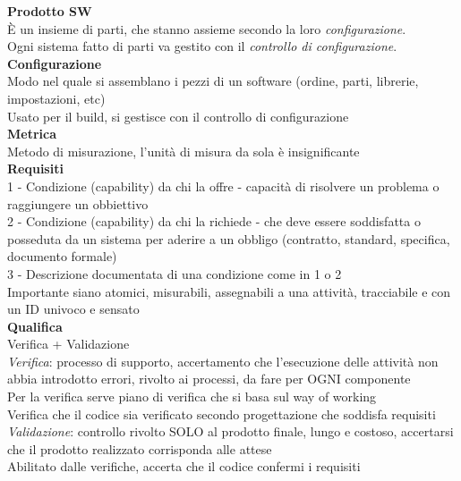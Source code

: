 \documentclass{article}
\begin{document}
		\textbf{Prodotto SW}\\
		È un insieme di parti, che stanno assieme secondo la loro \textit{configurazione}.\\
		Ogni sistema fatto di parti va gestito con il \textit{controllo di configurazione}.\\
			
		\textbf{Configurazione}\\
		Modo nel quale si assemblano i pezzi di un software (ordine, parti, librerie, impostazioni, etc)\\
		Usato per il build, si gestisce con il controllo di configurazione\\
			
		\textbf{Metrica}\\
		Metodo di misurazione, l'unità di misura da sola è insignificante\\
		
		\textbf{Requisiti}\\
		1 - Condizione (capability) da chi la offre - capacità di risolvere un problema o raggiungere un obbiettivo\\
		2 - Condizione (capability) da chi la richiede - che deve essere soddisfatta o posseduta da un sistema per aderire a un obbligo (contratto, standard, specifica, documento formale)\\
		3 - Descrizione documentata di una condizione come in 1 o 2\\
		Importante siano atomici, misurabili, assegnabili a una attività, tracciabile e con un ID univoco e sensato\\
		
		\textbf{Qualifica}\\
		Verifica + Validazione\\
		\textit{Verifica}: processo di supporto, accertamento che l'esecuzione delle attività non abbia introdotto errori, rivolto ai processi, da fare per OGNI componente\\
		Per la verifica serve piano di verifica che si basa sul way of working\\
		Verifica che il codice sia verificato secondo progettazione che soddisfa requisiti\\
		\textit{Validazione}: controllo rivolto SOLO al prodotto finale, lungo e costoso, accertarsi che il prodotto realizzato corrisponda alle attese\\
		Abilitato dalle verifiche, accerta che il codice confermi i requisiti\\
		
\end{document}
